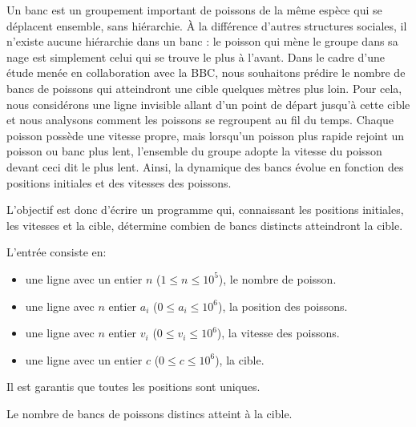 \problemname{}


Un banc est un groupement important de poissons de la même espèce qui se déplacent ensemble, sans hiérarchie. À la différence d'autres structures sociales, il n'existe aucune hiérarchie dans un banc : le poisson qui mène le groupe dans sa nage est simplement celui qui se trouve le plus à l'avant.
Dans le cadre d'une étude menée en collaboration avec la BBC, nous souhaitons prédire le nombre de bancs de poissons qui atteindront une cible quelques mètres plus loin.
Pour cela, nous considérons une ligne invisible allant d'un point de départ jusqu'à cette cible et nous analysons comment les poissons se regroupent au fil du temps.
Chaque poisson possède une vitesse propre, mais lorsqu'un poisson plus rapide rejoint un poisson ou banc plus lent, l'ensemble du groupe adopte la vitesse du poisson devant ceci dit le plus lent.
Ainsi, la dynamique des bancs évolue en fonction des positions initiales et des vitesses des poissons.

L'objectif est donc d'écrire un programme qui, connaissant les positions initiales, les vitesses et la cible, détermine combien de bancs distincts atteindront la cible.
\begin{Input}
    L'entrée consiste en:
    \begin{itemize}
        \item une ligne avec un entier $n$ ($1 \leq n \leq 10^{5}$), le nombre de poisson.
        \item une ligne avec $n$ entier $a_i$ ($0 \leq a_i \leq 10^{6}$), la position des poissons.
        \item une ligne avec $n$ entier $v_i$ ($0 \leq v_i \leq 10^{6}$), la vitesse des poissons.
        \item une ligne avec un entier $c$ ($0 \leq c \leq 10^{6}$), la cible.
    \end{itemize}
    Il est garantis que toutes les positions sont uniques.
\end{Input}

\begin{Output}
   Le nombre de bancs de poissons distincs atteint à la cible.
\end{Output}
